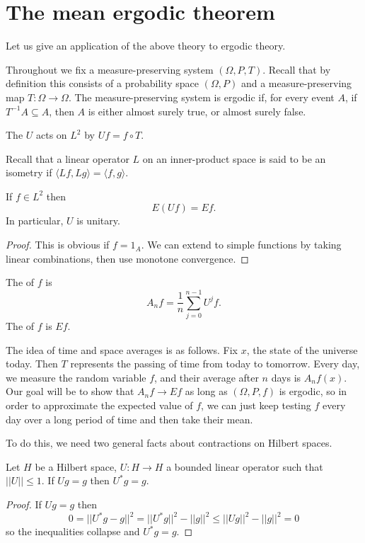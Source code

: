 \section{The mean ergodic theorem}
Let us give an application of the above theory to ergodic theory.

Throughout we fix a measure-preserving system $(\Omega, P, T)$.
Recall that by definition this consists of a probability space $(\Omega, P)$ and a measure-preserving map $T: \Omega \to \Omega$.
The measure-preserving system is ergodic if, for every event $A$, if $T^{-1}A \subseteq A$, then $A$ is either almost surely true, or almost surely false.

\begin{definition}
The  $U$ acts on $L^{2}$ by $Uf = f \circ T$.
\end{definition}

Recall that a linear operator $L$ on an inner-product space is said to be an isometry if $\langle Lf, Lg\rangle = \langle f, g\rangle$.

\begin{lemma}
If $f \in L^{2}$ then
\[E(Uf) = Ef.\]
In particular, $U$ is unitary.
\end{lemma}
\begin{proof}
This is obvious if $f = 1_{A}$.
We can extend to simple functions by taking linear combinations, then use monotone convergence.
\end{proof}

\begin{definition}
The  of $f$ is
\[A_{n}f = \frac{1}{n} \sum_{j=0}^{n-1} U^{j}f.\]
The  of $f$ is $Ef$.
\end{definition}

The idea of time and space averages is as follows. Fix $x$, the state of the universe today. Then $T$ represents the passing of time from today to tomorrow.
Every day, we measure the random variable $f$, and their average after $n$ days is $A_{n}f(x)$.
Our goal will be to show that $A_{n}f \to Ef$ as long as $(\Omega, P, f)$ is ergodic, so in order to approximate the expected value of $f$, we can just keep testing $f$ every day over a long period of time and then take their mean.

To do this, we need two general facts about contractions on Hilbert spaces.
\begin{lemma}
Let $H$ be a Hilbert space, $U: H \to H$ a bounded linear operator such that $||U|| \leq 1$.
If $Ug = g$ then $U^{*}g = g$.
\end{lemma}
\begin{proof}
If $Ug = g$ then
\[0 = ||U^{*}g - g||^{2} = ||U^{*}g||^{2} - ||g||^{2} \leq ||Ug||^{2} - ||g||^{2} = 0\]
so the inequalities collapse and $U^{*}g = g$.
\end{proof}

